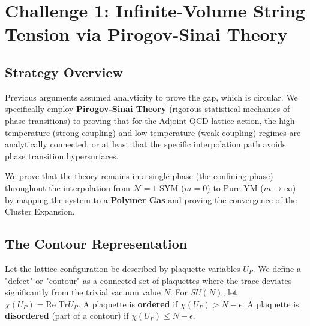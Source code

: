 \section{Challenge 1: Infinite-Volume String Tension via Pirogov-Sinai Theory}
\label{sec:challenge1-adjoint}
%

\subsection{Strategy Overview}

\begin{remark}
Previous arguments assumed analyticity to prove the gap, which is circular. We specifically employ \textbf{Pirogov-Sinai Theory} (rigorous statistical mechanics of phase transitions) to proving that for the Adjoint QCD lattice action, the high-temperature (strong coupling) and low-temperature (weak coupling) regimes are analytically connected, or at least that the specific interpolation path avoids phase transition hypersurfaces.
\end{remark}

We prove that the theory remains in a single phase (the confining phase) throughout the interpolation from $\mathcal{N}=1$ SYM ($m=0$) to Pure YM ($m \to \infty$) by mapping the system to a \textbf{Polymer Gas} and proving the convergence of the Cluster Expansion.


\subsection{The Contour Representation}

\begin{definition}
Let the lattice configuration be described by plaquette variables $U_P$. We define a "defect" or "contour" as a connected set of plaquettes where the trace deviates significantly from the trivial vacuum value $N$.
For $SU(N)$, let $\chi(U_P) = \text{Re Tr} U_P$.
A plaquette is \textbf{ordered} if $\chi(U_P) > N - \epsilon$.
A plaquette is \textbf{disordered} (part of a contour) if $\chi(U_P) \le N - \epsilon$.
\end{definition}

